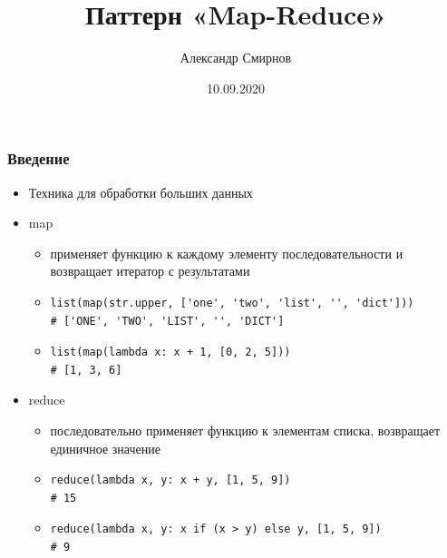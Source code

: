 \documentclass[xetex,mathserif,serif]{beamer}
\title{Паттерн «Map-Reduce»}
\author[Александр Смирнов]{Александр Смирнов}
\date{10.09.2020}
\begin{document}
\begin{frame}
	\titlepage{}
\end{frame}

\begin{frame}[fragile]

	\frametitle{Введение}

	\begin{itemize}
		\item Техника для обработки больших данных
		\item map
		      \begin{itemize}
			      \item применяет функцию к каждому элементу последовательности и возвращает итератор с результатами
			      \item
			            \begin{verbatim}
list(map(str.upper, ['one', 'two', 'list', '', 'dict']))
# ['ONE', 'TWO', 'LIST', '', 'DICT']

                        \end{verbatim}
			      \item
			            \begin{verbatim}
list(map(lambda x: x + 1, [0, 2, 5]))
# [1, 3, 6]

                        \end{verbatim}
		      \end{itemize}
		\item reduce
		      \begin{itemize}
			      \item последовательно применяет функцию к элементам списка, возвращает единичное значение
			      \item
			            \begin{verbatim}
reduce(lambda x, y: x + y, [1, 5, 9])
# 15

                        \end{verbatim}
			      \item
			            \begin{verbatim}
reduce(lambda x, y: x if (x > y) else y, [1, 5, 9])
# 9

                        \end{verbatim}
		      \end{itemize}
	\end{itemize}
\end{frame}
\end{document}
